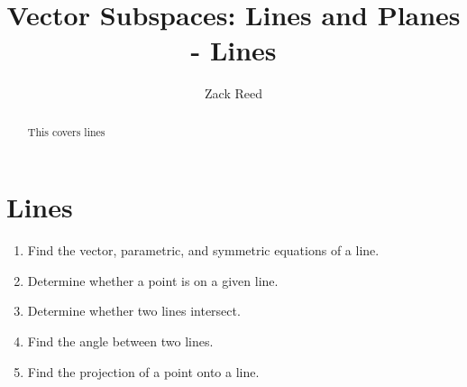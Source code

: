 \documentclass{ximera}
\author{Zack Reed}
\title{Vector Subspaces: Lines and Planes - Lines}
\begin{document}
\begin{abstract}

    This covers lines

\end{abstract}
\maketitle



\section{Lines}

  \begin{enumerate}
  \item Find the vector, parametric, and symmetric equations of a line.
  \item Determine whether a point is on a given line.
  \item Determine whether two lines intersect.
  \item Find the angle between two lines.
  \item Find the projection of a point onto a line.
  \end{enumerate}
\end{document}
